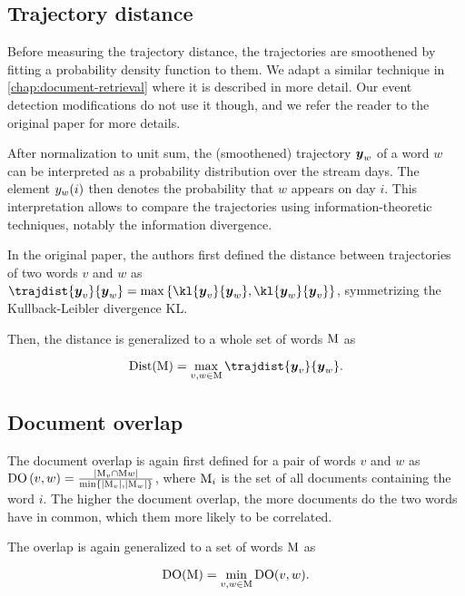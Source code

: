 \subsection{Trajectory distance}
Before measuring the trajectory distance, the trajectories are smoothened by fitting a probability density function to them. We adapt a similar technique in \autoref{chap:document-retrieval} where it is described in more detail. Our event detection modifications do not use it though, and we refer the reader to the original paper for more details.

After normalization to unit sum, the (smoothened) trajectory $\vect{\traj}_{w}$ of a word $w$ can be interpreted as a probability distribution over the stream days. The element $y_{w}(i)$ then denotes the probability that $w$ appears on day $i$. This interpretation allows to compare the trajectories using information-theoretic techniques, notably the information divergence.

In the original paper, the authors first defined the distance between trajectories of two words $v$ and $w$ as $\trajdist{\vect{\traj}_{v}}{\vect{\traj}_{w}} = \max \left\{ \kl{\vect{\traj}_{v}}{\vect{\traj}_{w}}, \kl{\vect{\traj}_{w}}{\vect{\traj}_{v}} \right\}$, symmetrizing the Kullback-Leibler divergence KL.

Then, the distance is generalized to a whole set of words $\text{M}$ as

\begin{equation}
	\text{Dist}( \featset ) = \max_{v, w \in \featset} \trajdist{\vect{\traj}_{v}}{\vect{\traj}_{w}}.
\end{equation}

\subsection{Document overlap}
The document overlap is again first defined for a pair of words $v$ and $w$ as $\text{DO}\left( v, w \right) = \frac{| \text{M}_{v} \cap \text{M}{w} |}{\min \left\{ | \text{M}_{v} |, | \text{M}_{w} | \right\}}$, where $\text{M}_{i}$ is the set of all documents containing the word $i$. The higher the document overlap, the more documents do the two words have in common, which them more likely to be correlated.

The overlap is again generalized to a set of words $\text{M}$ as

\begin{equation}
	\text{DO}( \text{M} ) = \min_{v, w \in \text{M}} \text{DO}( v, w ).
\end{equation}

